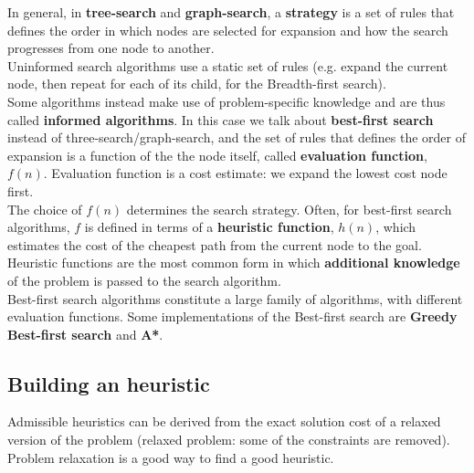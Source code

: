 \documentclass{article}
\begin{document}
In general, in \textbf{tree-search} and \textbf{graph-search}, a \textbf{strategy} is a set of rules that defines the order in which nodes are selected for expansion and how the search progresses from one node to another. \\
Uninformed search algorithms use a static set of rules (e.g. expand the current node, then repeat for each of its child, for the Breadth-first search). \\

Some algorithms instead make use of problem-specific knowledge and are thus called \textbf{informed algorithms}. In this case we talk about \textbf{best-first search} instead of three-search/graph-search, and the set of rules that defines the order of expansion is a function of the the node itself, called \textbf{evaluation function}, $f(n)$. Evaluation function is a cost estimate: we expand the lowest cost node
first. \\

The choice of $f(n)$ determines the search strategy. Often, for best-first search algorithms, $f$ is defined in terms of a \textbf{heuristic function}, $h(n)$, which estimates the cost of the cheapest path from the current node to the goal. Heuristic functions are the most common form in which \textbf{additional knowledge} of the problem is passed to the search algorithm. \\

Best-first search algorithms constitute a large family of algorithms, with different evaluation functions. Some implementations of the Best-first search are \textbf{Greedy Best-first search} and \textbf{A*}.

\subsection{Building an heuristic}

Admissible heuristics can be derived from the exact solution cost of a relaxed version of the problem (relaxed problem: some of the constraints are removed). Problem relaxation is a good way to find a good heuristic. \\

\newpage

\begin{figure}[h!]
    \centering
\end{figure}
\end{document}

